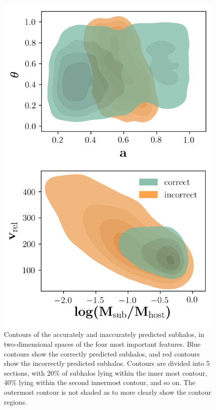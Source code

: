 \documentclass[fleqn,usenatbib]{mnras}
\begin{document}
\begin{figure}
	\includegraphics[width=\textwidth]{Figures/survival_contours}
	\vspace{-20pt}
    \caption{Contours of the accurately and inaccurately predicted subhalos, in two-dimensional spaces of the four most important features. Blue contours show the correctly predicted subhalos, and red contours show the incorrectly predicted subhalos. Contours are divided into 5 sections, with 20\% of subhalos lying within the inner most contour, 40\% lying within the second innermost contour, and so on. The outermost contour is not shaded as to more clearly show the contour regions.}
    \label{fig:survival_contours}
\end{figure}
\end{document}
